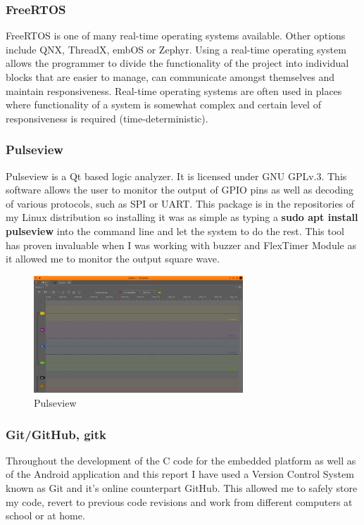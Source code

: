 \documentclass[12pt,a4paper]{article}
\begin{document}
		\subsubsection{FreeRTOS}
		FreeRTOS is one of many real-time operating systems available. Other options include QNX, 
		ThreadX, embOS or Zephyr. Using a real-time operating system allows the programmer to 
		divide the functionality of the project into individual blocks that are easier to manage, 
		can communicate amongst themselves and maintain responsiveness. Real-time operating
		systems are often used in places where functionality of a system is somewhat complex and 
		certain level of responsiveness is required (time-deterministic).
		
		\subsubsection{Pulseview}
		Pulseview is a Qt based logic analyzer. It is licensed under GNU GPLv.3. This software  
		allows the user to monitor the output of GPIO pins as well as decoding of various protocols,
		such as SPI or UART. This package is in the repositories of my Linux distribution so 
		installing it was as simple as typing a {\bfseries sudo apt install pulseview} into the command line and let the system to do the rest. This tool has proven invaluable when 
		I was working with buzzer and FlexTimer Module as it allowed me to monitor the output
		square wave.
		
		\begin{figure}[h]
			\centering
			\includegraphics[width=0.7\textwidth]{pulseview}
			\caption{Pulseview}
		\end{figure}
	
		\subsubsection{Git/GitHub, gitk}
		Throughout the development of the C code for the embedded platform as well as of the 
		Android application and this report I have used a Version Control System known as Git and 
		it's online counterpart GitHub. This allowed me to safely store my code, revert to 
		previous code revisions and work from different computers at school or at home.
		
\end{document}
